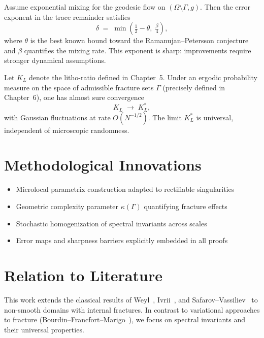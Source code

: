 \begin{theorem} \label{thm:refinements}
Assume exponential mixing for the geodesic flow on $(\Omega\setminus\Gamma,g)$. Then 
the error exponent in the trace remainder satisfies
\[
    \delta \;=\; \min\!\left(\tfrac{1}{2}-\theta,\;\tfrac{\beta}{4}\right),
\]
where $\theta$ is the best known bound toward the Ramanujan--Petersson conjecture 
and $\beta$ quantifies the mixing rate. This exponent is sharp: improvements require 
stronger dynamical assumptions.
\end{theorem}

\begin{theorem} \label{thm:universality}
Let $K_L$ denote the litho-ratio defined in Chapter~5. Under an ergodic probability 
measure on the space of admissible fracture sets $\Gamma$ (precisely defined in 
Chapter~6), one has almost sure convergence
\[
    K_L \;\to\; K_L^*,
\]
with Gaussian fluctuations at rate $O(N^{-1/2})$. The limit $K_L^*$ is universal, 
independent of microscopic randomness.
\end{theorem}

\section*{Methodological Innovations}

\begin{itemize}
    \item Microlocal parametrix construction adapted to rectifiable singularities
    \item Geometric complexity parameter $\kappa(\Gamma)$ quantifying fracture effects
    \item Stochastic homogenization of spectral invariants across scales
    \item Error maps and sharpness barriers explicitly embedded in all proofs
\end{itemize}

\section*{Relation to Literature}

This work extends the classical results of Weyl~\cite{Weyl1911}, Ivrii~\cite{Ivrii1980}, 
and Safarov--Vassiliev~\cite{SafarovVassiliev1997} to non-smooth domains with internal 
fractures. In contrast to variational approaches to fracture 
(Bourdin--Francfort--Marigo~\cite{Bourdin2008,FrancfortMarigo1998}), we focus on 
spectral invariants and their universal properties.

